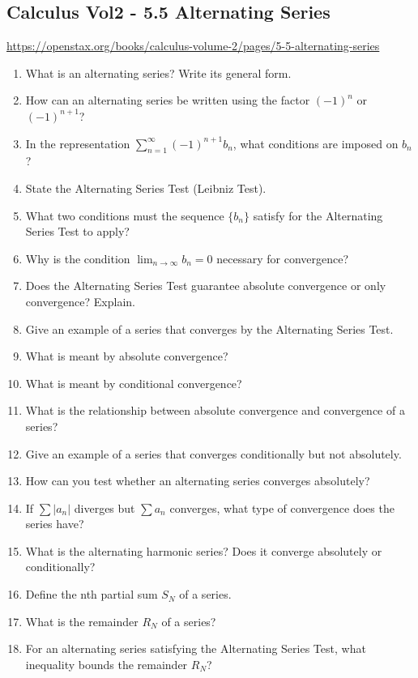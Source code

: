 \subsection{Calculus Vol2 - 5.5 Alternating Series}

\url{https://openstax.org/books/calculus-volume-2/pages/5-5-alternating-series}

\begin{enumerate}
  \item What is an alternating series? Write its general form.
  \item How can an alternating series be written using the factor $(-1)^n$ or $(-1)^{n+1}$?
  \item In the representation $\sum_{n=1}^{\infty} (-1)^{n+1} b_n$, what conditions are imposed on $b_n$?
  \item State the Alternating Series Test (Leibniz Test).
  \item What two conditions must the sequence $\{b_n\}$ satisfy for the Alternating Series Test to apply?
  \item Why is the condition $\lim_{n \to \infty} b_n = 0$ necessary for convergence?
  \item Does the Alternating Series Test guarantee absolute convergence or only convergence? Explain.
  \item Give an example of a series that converges by the Alternating Series Test.
  \item What is meant by absolute convergence?
  \item What is meant by conditional convergence?
  \item What is the relationship between absolute convergence and convergence of a series?
  \item Give an example of a series that converges conditionally but not absolutely.
  \item How can you test whether an alternating series converges absolutely?
  \item If $\sum |a_n|$ diverges but $\sum a_n$ converges, what type of convergence does the series have?
  \item What is the alternating harmonic series? Does it converge absolutely or conditionally?
  \item Define the nth partial sum $S_N$ of a series.
  \item What is the remainder $R_N$ of a series?
  \item For an alternating series satisfying the Alternating Series Test, what inequality bounds the remainder $R_N$?

\end{enumerate}
